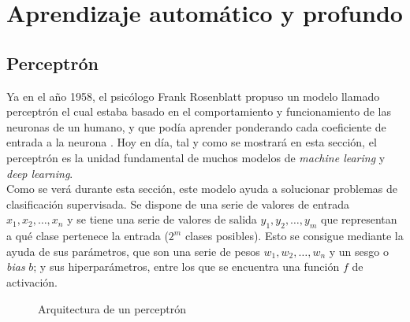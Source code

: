 \chapter{Aprendizaje automático y profundo}

	\section{Perceptrón}
	
		Ya en el año 1958, el psicólogo Frank Rosenblatt propuso un modelo llamado perceptrón el cual estaba basado en el comportamiento y funcionamiento de las neuronas de un humano, y que podía aprender ponderando cada coeficiente de entrada a la neurona \cite{historiaIA}. Hoy en día, tal y como se mostrará en esta sección, el perceptrón es la unidad fundamental de muchos modelos de \textit{machine learing} y \textit{deep learning}. \\
		
		Como se verá durante esta sección, este modelo ayuda a solucionar problemas de clasificación supervisada. Se dispone de una serie de valores de entrada $x_1, x_2, \hdots, x_n$ y se tiene una serie de valores de salida $y_1, y_2, \hdots, y_m$ que representan a qué clase pertenece la entrada ($2^m$ clases posibles). Esto se consigue mediante la ayuda de sus parámetros, que son una serie de pesos $w_1, w_2, \hdots, w_n$ y un sesgo o \textit{bias} $b$; y sus hiperparámetros, entre los que se encuentra una función $f$ de activación. \\
		
		\begin{figure}[!h]
			\centering
			\caption{Arquitectura de un perceptrón}
			\label{fig:perceptron}
		\end{figure}
		
